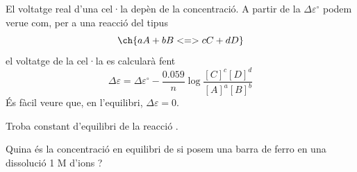 El voltatge real d'una cel·la depèn de la concentració.
A partir de la $\Delta \varepsilon^{\circ}$ podem verue com, per a una reacció del tipus 
\[\ch{a A + b B <=> c C + d D}\]
el voltatge de la cel·la es calcularà fent
\[\Delta \varepsilon=\Delta \varepsilon^{\circ}-\frac{0.059}{n} \log \frac{[C]^c[D]^d}{[A]^a[B]^b}\] 
És fàcil veure que, en l'equilibri, $\Delta \varepsilon=0$.

\begin{exr}
Troba constant d'equilibri de la reacció .
\end{exr}

\begin{exr}
Quina és la concentració en equilibri de  si posem una barra de ferro en una dissolució 1 M d'ions ?
\end{exr}

